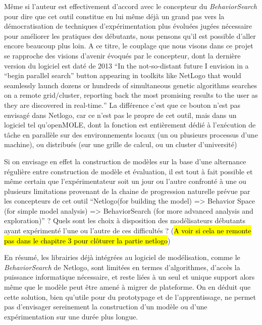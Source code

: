 Même si l'auteur est effectivement d'accord avec le concepteur du \textit{BehaviorSearch} pour dire que cet outil constitue en lui même déjà un grand pas vers la démocratisation de techniques d'expérimentation plus évoluées jugées nécessaire pour améliorer les pratiques des débutants, nous pensons qu'il est possible d'aller encore beaucoup plus loin. A ce titre, le couplage que nous visons dans ce projet se rapproche des visions d'avenir évoqués par le concepteur, dont la dernière version du logiciel est daté de 2013 \textcite[295]{Stonedahl2011a} \foreignquote{english}{In the not-so-distant future I envision in a “begin parallel search” button appearing in toolkits like NetLogo that would seamlessly launch dozens or hundreds of simultaneous genetic algorithms searches on a remote grid/cluster, reporting back the most promising results to the user as they are discovered in real-time.} La différence c'est que ce bouton n'est pas envisagé dans Netlogo, car ce n'est pas le propre de cet outil, mais dans un logiciel tel qu'openMOLE, dont la fonction est entièrement dédié à l'exécution de tâche en parallèle sur des environnements locaux (un ou plusieurs processus d'une machine), ou distribués (sur une grille de calcul, ou un cluster d'université)

Si on envisage en effet la construction de modèles sur la base d'une alternance régulière entre construction de modèle et évaluation, il est tout à fait possible et même certain que l'expérimentateur soit un jour ou l'autre confronté à une ou plusieurs limitations provenant de la chaine de progression naturelle prévue par les concepteurs de cet outil \foreignquote{english}{Netlogo(for building the model) => Behavior Space (for simple model analysis) => BehaviorSearch (for more advanced analysis and exploration)} \autocite[340]{Stonedahl2011a} ? Quels sont les choix à disposition des modélisateurs débutants ayant expérimenté l'une ou l'autre de ces difficultés ? (\hl{A voir si cela ne remonte pas dans le chapitre 3 pour clôturer la partie netlogo})

En résumé, les librairies déjà intégrées au logiciel de modélisation, comme le \textit{BehaviorSearch} de Netlogo, sont limitées en termes d'algorithmes, d'accès la puissance informatique nécessaire, et reste liées à un seul et unique support alors même que le modèle peut être amené à migrer de plateforme. On en déduit que cette solution, bien qu'utile pour du prototypage et de l'apprentissage, ne permet pas d'envisager sereinement la construction d'un modèle ou d'une expérimentation sur une durée plus longue.

